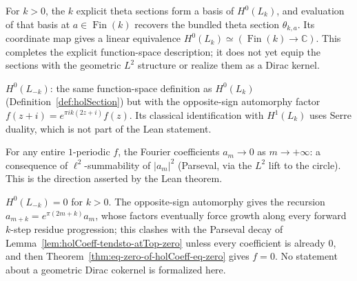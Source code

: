 \begin{theorem}
  \label{thm:thetaHolSectionBasis}
  \leanok
  For $k>0$, the $k$ explicit theta sections form a basis of $H^0(L_k)$, and evaluation of
  that basis at $a\in\operatorname{Fin}(k)$ recovers the bundled theta section
  $\theta_{k,a}$.  Its coordinate map gives a linear equivalence
  $H^0(L_k)\simeq (\operatorname{Fin}(k)\to\mathbb C)$.  This completes the explicit
  function-space description; it does not yet equip the sections with the geometric $L^2$
  structure or realize them as a Dirac kernel.
\end{theorem}

\begin{definition}
  \label{def:holSectionNeg}
  \leanok
  $H^0(L_{-k})$: the same function-space definition as $H^0(L_k)$
  (Definition~\ref{def:holSection}) but with the opposite-sign automorphy factor
  $f(z+i) = e^{\pi i k(2z+i)} f(z)$.  Its classical identification with $H^1(L_k)$ uses
  Serre duality, which is not part of the Lean statement.
\end{definition}

\begin{lemma}
  \label{lem:holCoeff-tendsto-atTop-zero}
  \leanok
  For any entire $1$-periodic $f$, the Fourier coefficients $a_m \to 0$ as
  $m \to +\infty$: a consequence of $\ell^2$-summability of $|a_m|^2$ (Parseval, via the
  $L^2$ lift to the circle). This is the direction asserted by the Lean theorem.
\end{lemma}

\begin{theorem}
  \label{thm:holSectionNeg-eq-bot}
  \leanok
  $H^0(L_{-k}) = 0$ for $k > 0$. The opposite-sign automorphy gives the recursion
  $a_{m+k} = e^{\pi(2m+k)} a_m$,
  whose factors eventually force growth along every forward $k$-step residue progression;
  this clashes with the Parseval decay of
  Lemma~\ref{lem:holCoeff-tendsto-atTop-zero} unless every coefficient is already $0$, and then
  Theorem~\ref{thm:eq-zero-of-holCoeff-eq-zero} gives $f = 0$.  No statement about a geometric
  Dirac cokernel is formalized here.
\end{theorem}

